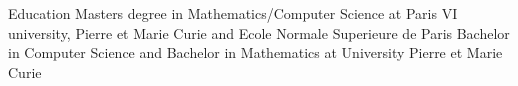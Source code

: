 \begin{rubric}{\color{ForestGreen} Education}
  Masters degree in Mathematics/Computer Science at Paris VI university, Pierre et
  Marie Curie and Ecole Normale Superieure de Paris
  Bachelor in Computer Science and Bachelor in Mathematics at University Pierre et Marie Curie


\end{rubric}

